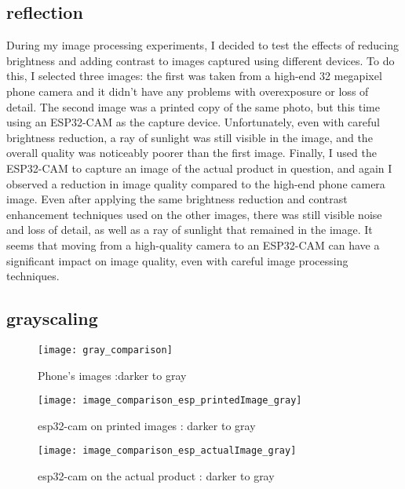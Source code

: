 \subsection{reflection}
During my image processing experiments, I decided to test the effects of reducing brightness and adding contrast to images captured using different devices. To do this, I selected three images: the first was taken from a high-end 32 megapixel phone camera and it didn't have any problems with overexposure or loss of detail. The second image was a printed copy of the same photo, but this time using an ESP32-CAM as the capture device. Unfortunately, even with careful brightness reduction, a ray of sunlight was still visible in the image, and the overall quality was noticeably poorer than the first image. Finally, I used the ESP32-CAM to capture an image of the actual product in question, and again I observed a reduction in image quality compared to the high-end phone camera image. Even after applying the same brightness reduction and contrast enhancement techniques used on the other images, there was still visible noise and loss of detail, as well as a ray of sunlight that remained in the image. It seems that moving from a high-quality camera to an ESP32-CAM can have a significant impact on image quality, even with careful image processing techniques.
\subsection{grayscaling}

\FloatBarrier
\begin{figure}[h]
\FloatBarrier
         \centering
        \texttt{[image: gray\_comparison]}
   
        \caption{Phone's images :darker to gray}
        \label{fig:Phone's images : darker to gray}
\FloatBarrier
    \end{figure}


\FloatBarrier
\FloatBarrier
\begin{figure}[h]
\FloatBarrier
         \centering
        \texttt{[image: image\_comparison\_esp\_printedImage\_gray]}
   
        \caption{esp32-cam on printed images : darker to gray}
        \label{fig:esp32-cam on printed images :  darker to gray}
\FloatBarrier
    \end{figure}


\FloatBarrier
\FloatBarrier
\begin{figure}[h]
\FloatBarrier
         \centering
        \texttt{[image: image\_comparison\_esp\_actualImage\_gray]}
   
        \caption{esp32-cam on the actual product : darker to gray}
        \label{fig:Phone's images :  darker to gray}
\FloatBarrier
    \end{figure}


